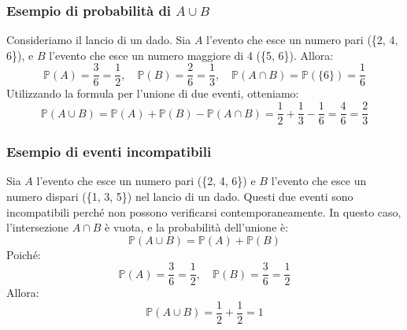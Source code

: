 \documentclass{article}
\begin{document}
\begin{center}
\end{center}

\subsubsection{Esempio di probabilità di \(A \cup B\)}
Consideriamo il lancio di un dado. Sia \(A\) l'evento che esce un numero pari (\{2, 4, 6\}),
e \(B\) l'evento che esce un numero maggiore di 4 (\{5, 6\}). Allora:
\[
    \mathbb{P}(A) = \frac{3}{6} = \frac{1}{2}, \quad \mathbb{P}(B) = \frac{2}{6} = \frac{1}{3},
    \quad \mathbb{P}(A \cap B) = \mathbb{P}(\{6\}) = \frac{1}{6}
\]
Utilizzando la formula per l'unione di due eventi, otteniamo:
\[
    \mathbb{P}(A \cup B) = \mathbb{P}(A) + \mathbb{P}(B) - \mathbb{P}(A \cap B) =
    \frac{1}{2} + \frac{1}{3} - \frac{1}{6} = \frac{4}{6} = \frac{2}{3}
\]

\subsubsection{Esempio di eventi incompatibili}
Sia \(A\) l'evento che esce un numero pari (\{2, 4, 6\}) e \(B\) l'evento che esce un numero
dispari (\{1, 3, 5\}) nel lancio di un dado. Questi due eventi sono incompatibili perché non
possono verificarsi contemporaneamente. In questo caso, l'intersezione \(A \cap B\) è vuota,
e la probabilità dell'unione è:
\[
    \mathbb{P}(A \cup B) = \mathbb{P}(A) + \mathbb{P}(B)
\]
Poiché:
\[
    \mathbb{P}(A) = \frac{3}{6} = \frac{1}{2}, \quad \mathbb{P}(B) = \frac{3}{6} = \frac{1}{2}
\]
Allora:
\[
    \mathbb{P}(A \cup B) = \frac{1}{2} + \frac{1}{2} = 1
\]

\begin{center}
\end{center}
\end{document}
